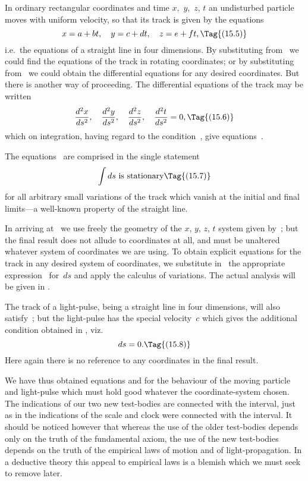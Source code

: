 \documentclass[12pt]{book}
\begin{document}
In ordinary rectangular coordinates and time $x$,~$y$,~$z$, $t$ an undisturbed
particle moves with uniform velocity, so that its track is given by the
equations
\[
x = a + bt,\quad
y = c + dt,\quad
z = e + ft,
\Tag{(15.5)}
\]
i.e.\ the equations of a straight line in four dimensions. By substituting from~
we could find the equations of the track in rotating coordinates; or by
substituting from~ we could obtain the differential equations for any
desired coordinates. But there is another way of proceeding. The differential
equations of the track may be written
\[
\frac{d^2 x}{ds^2},\quad
\frac{d^2 y}{ds^2},\quad
\frac{d^2 z}{ds^2},\quad
\frac{d^2 t}{ds^2} = 0,
\Tag{(15.6)}
\]
which on integration, having regard to the condition~, give equations~.

The equations~ are comprised in the single statement
\[
\int ds \text{ is stationary}
\Tag{(15.7)}
\]
for all arbitrary small variations of the track which vanish at the initial and
final limits---a well-known property of the straight line.

In arriving at~ we use freely the geometry of the $x$, $y$, $z$, $t$ system
%
%
given by~; but the final result does not allude to coordinates at all, and
must be unaltered whatever system of coordinates we are using. To obtain
explicit equations for the track in any desired system of coordinates, we
substitute in~ the appropriate expression~ for~$ds$ and apply the
calculus of variations. The actual analysis will be given in .

The track of a light-pulse, being a straight line in four dimensions, will
%
also satisfy~; but the light-pulse has the special velocity~$c$ which gives
the additional condition obtained in , viz.
\[
ds = 0.
\Tag{(15.8)}
\]
Here again there is no reference to any coordinates in the final result.

We have thus obtained equations  and  for the behaviour of
the moving particle and light-pulse which must hold good whatever the
coordinate\hyp{}system chosen. The indications of our two new test\hyp{}bodies are
connected with the interval, just as in  the indications of the scale and
clock were connected with the interval. It should be noticed however that
whereas the use of the older test\hyp{}bodies depends only on the truth of the
fundamental axiom, the use of the new test\hyp{}bodies depends on the truth of the
empirical laws of motion and of light\hyp{}propagation. In a deductive theory this
appeal to empirical laws is a blemish which we must seek to remove later.
\end{document}
